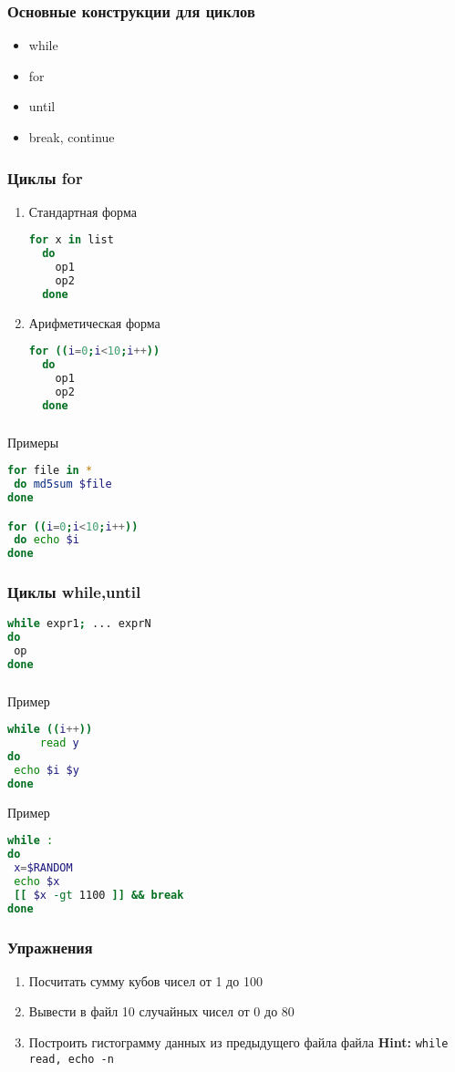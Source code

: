 \begin{frame}
\frametitle{Основные конструкции для циклов}
  \begin{itemize}
   \item while
   \item for
   \item until
   \item break, continue 
  \end{itemize}
\end{frame}

\begin{frame}[fragile]
  \frametitle{Циклы for}
  \begin{enumerate}
    \item Стандартная форма
\begin{lstlisting}[language=sh,frame=single]
  for x in list 
  do
    op1
    op2
  done
\end{lstlisting}
    \item Арифметическая форма
\begin{lstlisting}[language=sh,frame=single]
  for ((i=0;i<10;i++)) 
  do
    op1
    op2
  done
\end{lstlisting}
  \end{enumerate}
\end{frame}
\begin{frame}[fragile]
\frametitle{}
  \begin{block}{Примеры}
\begin{lstlisting}[language=sh,frame=single]
for file in *
 do md5sum $file
done

for ((i=0;i<10;i++))
 do echo $i
done
\end{lstlisting}
  \end{block}
\end{frame}

\begin{frame}[fragile]
\frametitle{Циклы while,until}
\begin{lstlisting}[language=sh,frame=single]
while expr1; ... exprN
do
 op
done
\end{lstlisting}
\end{frame}

\begin{frame}[fragile]
\frametitle{}
\begin{block}{Пример}
\begin{lstlisting}[language=sh,frame=single]
while ((i++))
     read y
do
 echo $i $y
done
\end{lstlisting}
\end{block}
\begin{block}{Пример}
\begin{lstlisting}[language=sh,frame=single]
while :
do
 x=$RANDOM
 echo $x
 [[ $x -gt 1100 ]] && break
done
\end{lstlisting}
\end{block}
\end{frame}

\begin{frame}[fragile]
\frametitle{Упражнения}
\begin{enumerate}
\item Посчитать сумму кубов чисел от 1 до 100
\item Вывести в файл 10 случайных чисел от 0 до 80
\item Построить гистограмму данных из предыдущего файла файла {\bf Hint:} {\tt while read, echo -n }
\end{enumerate}
\end{frame}
